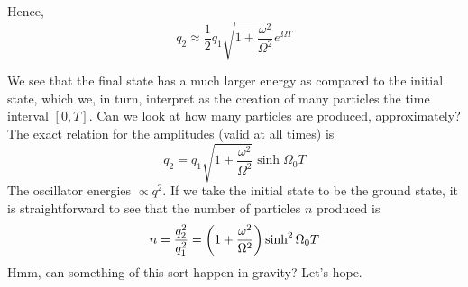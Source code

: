 \documentclass[a4paper,11pt]{article}
\newcommand{\bes}{\begin{equation*}}
\newcommand{\ees}{\end{equation*}}
\begin{document}
Hence,
$$q_2 \approx \frac{1}{2} q_1 \sqrt{1 + \frac{\omega^2}{\Omega^2}} e^{\Omega T}$$

We see that the final state has a much larger energy as compared to the initial state, which we, in turn, interpret as the creation of many particles the time interval $[0,T]$. Can we look at how many particles are produced, approximately? The exact relation for the amplitudes (valid at all times) is 
\bes
q_2 =  q_1 \sqrt{1 + \frac{\omega^2}{\Omega^2}} \sinh \Omega_0 T
\ees
The oscillator energies $\propto q^2$. If we take the initial state to be the ground state, it is straightforward to see that the number of particles $ n  $ produced is 
\bes
n = \dfrac{q_2^2}{q_1^2} = \qty(1+ \dfrac{\omega^2}{\Omega^2})\sinh^2 \Omega_0 T
\ees
Hmm, can something of this sort happen in gravity? Let's hope.
\end{document}
